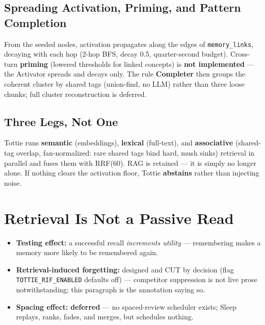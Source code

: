 \subsection{Spreading Activation, Priming, and Pattern Completion}
From the seeded nodes, activation propagates along the edges of \texttt{memory\_links}, decaying with
each hop (2-hop BFS, decay 0.5, quarter-second budget). Cross-turn \textbf{priming} (lowered
thresholds for linked concepts) is \textbf{not implemented} --- the Activator spreads and decays
only. The rule \textbf{Completer} then groups the coherent cluster by shared tags (union-find, no
LLM) rather than three loose chunks; full cluster reconstruction is deferred.

\subsection{Three Legs, Not One}
Tottie runs \textbf{semantic} (embeddings), \textbf{lexical} (full-text), and \textbf{associative}
(shared-tag overlap, fan-normalized: rare shared tags bind hard, mush sinks) retrieval in parallel
and fuses them with RRF(60). RAG is retained --- it is simply no longer alone. If nothing clears
the activation floor, Tottie \textbf{abstains} rather than injecting noise.

\section{Retrieval Is Not a Passive Read}
\begin{itemize}
  \item \textbf{Testing effect:} a successful recall \emph{increments utility} --- remembering makes a
  memory more likely to be remembered again.
  \item \textbf{Retrieval-induced forgetting:} designed and CUT by decision (flag
  \texttt{TOTTIE\_RIF\_ENABLED} defaults off) --- competitor suppression is not live prose
  notwithstanding; this paragraph is the annotation saying so.
  \item \textbf{Spacing effect:} \textbf{deferred} --- no spaced-review scheduler exists; Sleep
  replays, ranks, fades, and merges, but schedules nothing.
\end{itemize}


